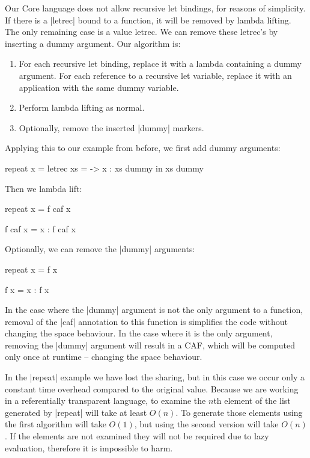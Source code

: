 Our Core language does not allow recursive let bindings, for reasons of simplicity. If there is a |letrec| bound to a function, it will be removed by lambda lifting. The only remaining case is a value letrec. We can remove these letrec's by inserting a dummy argument. Our algorithm is:

\begin{enumerate}
\item For each recursive let binding, replace it with a lambda containing a dummy argument. For each reference to a recursive let variable, replace it with an application with the same dummy variable.
\item Perform lambda lifting as normal.
\item Optionally, remove the inserted |dummy| markers.
\end{enumerate}

Applying this to our example from before, we first add dummy arguments:

\begin{code}
repeat x =  letrec xs = \dummy ->  x : xs dummy
            in xs dummy
\end{code}

Then we lambda lift:

\begin{code}
repeat x = f caf x

f caf x = x : f caf x
\end{code}

Optionally, we can remove the |dummy| arguments:

\begin{code}
repeat x = f x

f x = x : f x
\end{code}

In the case where the |dummy| argument is not the only argument to a function, removal of the |caf| annotation to this function is simplifies the code without changing the space behaviour. In the case where it is the only argument, removing the |dummy| argument will result in a CAF, which will be computed only once at runtime -- changing the space behaviour.

In the |repeat| example we have lost the sharing, but in this case we occur only a constant time overhead compared to the original value. Because we are working in a referentially transparent language, to examine the $n$th element of the list generated by |repeat| will take at least $O(n)$. To generate those elements using the first algorithm will take $O(1)$, but using the second version will take $O(n)$. If the elements are not examined they will not be required due to lazy evaluation, therefore it is impossible to harm.

